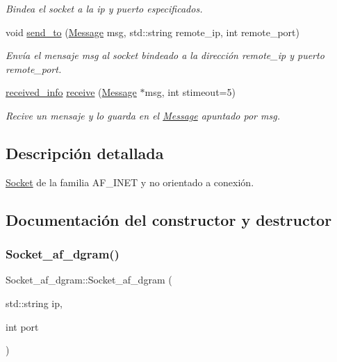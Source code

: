 \begin{DoxyCompactItemize}
\begin{DoxyCompactList}\small\item\em Bindea el socket a la ip y puerto especificados. \end{DoxyCompactList}\item 
void \hyperlink{classSocket__af__dgram_a744bb661eeebe5b5cdfca0028da6bd88}{send\+\_\+to} (\hyperlink{structMessage}{Message} msg, std\+::string remote\+\_\+ip, int remote\+\_\+port)
\begin{DoxyCompactList}\small\item\em Envía el mensaje {\itshape msg} al socket bindeado a la dirección {\itshape remote\+\_\+ip} y puerto {\itshape remote\+\_\+port}. \end{DoxyCompactList}\item 
\hyperlink{structreceived__info}{received\+\_\+info} \hyperlink{classSocket__af__dgram_ac7d122d2317d980c48964076c3c7e2bb}{receive} (\hyperlink{structMessage}{Message} $\ast$msg, int stimeout=5)
\begin{DoxyCompactList}\small\item\em Recive un mensaje y lo guarda en el \hyperlink{structMessage}{Message} apuntado por {\itshape msg}. \end{DoxyCompactList}\end{DoxyCompactItemize}


\subsection{Descripción detallada}
\hyperlink{classSocket}{Socket} de la familia A\+F\+\_\+\+I\+N\+ET y no orientado a conexión. 

\subsection{Documentación del constructor y destructor}
\mbox{\label{classSocket__af__dgram_a11391f68bb56dafa6be879f388e4b0cd}} 
\subsubsection{\texorpdfstring{Socket\+\_\+af\+\_\+dgram()}{Socket\_af\_dgram()}\hspace{0.1cm}{\footnotesize\ttfamily [1/2]}}
{\footnotesize\ttfamily Socket\+\_\+af\+\_\+dgram\+::\+Socket\+\_\+af\+\_\+dgram (\begin{DoxyParamCaption}\item[{std\+::string}]{ip,  }\item[{int}]{port }\end{DoxyParamCaption})}

